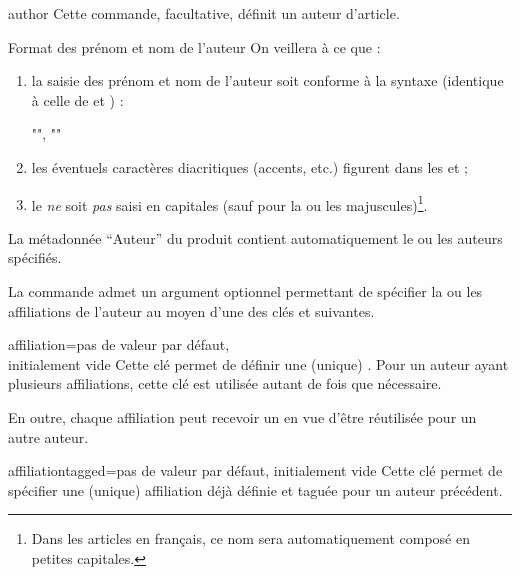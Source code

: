 \documentclass[french,nolocaltoc]{nwejmart}
\newtheorem[style=definition]{fait}
\newtheorem[title=contraventionnalisation]{ctrv}
\newtheorem[title-plural=anneaux]{anneau}
\newtheorem[title-plural=idéaux]{idéal}
\begin{document}
\begin{docCommand}{author}{}
  Cette commande, facultative, définit un auteur d'article.
\end{docCommand}
%
\begin{dbwarning}{Format des prénom et nom de l'auteur}{}
  On veillera à ce que :
  \begin{enumerate}
  \item la saisie des prénom et nom de l'auteur soit conforme à la syntaxe
    (identique à celle de  et ) :
\begin{bodycode}[listing options={showspaces}]
"", ""
\end{bodycode}
  \item les éventuels caractères diacritiques (accents, etc.) figurent dans les
     et  ;
  \item le  \emph{ne} soit \emph{pas} saisi en capitales (sauf pour la
    ou les majuscules)\footnote{Dans les articles en français, ce nom sera
      automatiquement composé en petites capitales.}.
  \end{enumerate}

  La métadonnée \enquote{Auteur} du  produit contient automatiquement
  le ou les auteurs spécifiés.
\end{dbwarning}

La commande  admet un argument optionnel permettant de spécifier
la ou les affiliations de l'auteur au moyen d'une des clés 
et  suivantes.

\begin{docKey}{affiliation}{={}}{pas de valeur par défaut,\\initialement vide}
  Cette clé permet de définir une (unique) . Pour un auteur
  ayant plusieurs affiliations, cette clé est utilisée autant de fois que
  nécessaire.

  En outre, chaque affiliation peut recevoir un  en vue d'être
  réutilisée pour un autre auteur.
\end{docKey}

\begin{docKey}{affiliationtagged}{={}}{pas de valeur par défaut,
    initialement vide}
  Cette clé permet de spécifier une (unique) affiliation déjà définie et taguée
  pour un auteur précédent.
\end{docKey}
\end{document}
